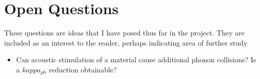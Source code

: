 \documentclass[a4paper,10pt,journal]{IEEEtran}
\begin{document}
\section{Open Questions}
These questions are ideas that I have posed thus far in the project.
They are included as an interest to the reader, perhaps indicating
area of further study

\begin{itemize}
  \item Can acoustic stimulation of a material cause additional phonon
  collisions? Is a $kappa_{ph}$ reduction obtainable?
\end{itemize}
\end{document}
